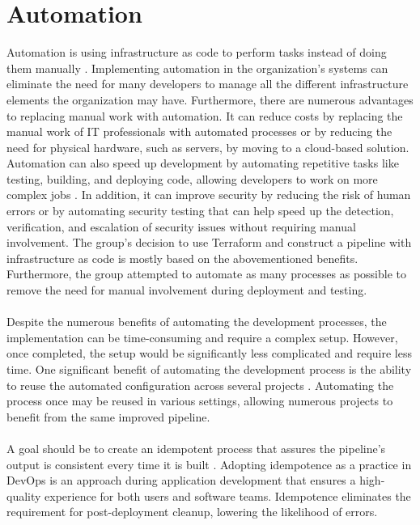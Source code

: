 \section{Automation}
Automation is using \gls{infrastructure as code} to perform tasks instead of doing them manually \cite{automationredhat}. Implementing automation in the organization's systems can eliminate the need for many developers to manage all the different infrastructure elements the organization may have. Furthermore, there are numerous advantages to replacing manual work with automation. It can reduce costs by replacing the manual work of IT professionals with automated processes or by reducing the need for physical hardware, such as servers, by moving to a cloud-based solution. Automation can also speed up development by automating repetitive tasks like testing, building, and deploying code, allowing developers to work on more complex jobs \cite{automation}. In addition, it can improve security by reducing the risk of human errors or by automating security testing that can help speed up the detection, verification, and escalation of security issues without requiring manual involvement. The group's decision to use Terraform and construct a pipeline with \gls{infrastructure as code} is mostly based on the abovementioned benefits. Furthermore, the group attempted to automate as many processes as possible to remove the need for manual involvement during deployment and testing. 
\\~\\
Despite the numerous benefits of automating the development processes, the implementation can be time-consuming and require a complex setup. However, once completed, the setup would be significantly less complicated and require less time. One significant benefit of automating the development process is the ability to reuse the automated configuration across several projects \cite{reusepipeline}. Automating the process once may be reused in various settings, allowing numerous projects to benefit from the same improved pipeline. 
\\~\\
A goal should be to create an \gls{idempotent} process that assures the pipeline's output is consistent every time it is built \cite{idempotent}. Adopting idempotence as a practice in DevOps is an approach during application development that ensures a high-quality experience for both users and software teams. Idempotence eliminates the requirement for post-deployment cleanup, lowering the likelihood of errors. 

